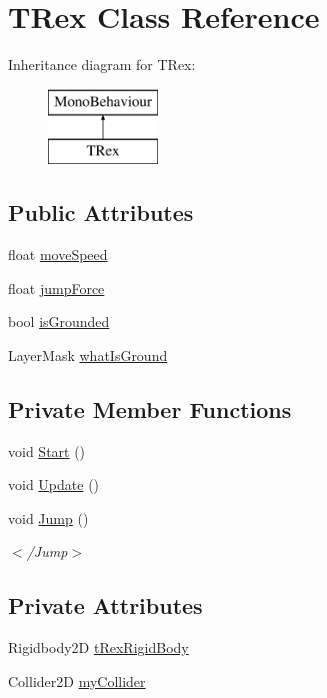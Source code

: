 \hypertarget{class_t_rex}{}\section{T\+Rex Class Reference}
\label{class_t_rex}
Inheritance diagram for T\+Rex\+:\begin{figure}[H]
\begin{center}
\leavevmode
\includegraphics[height=2.000000cm]{class_t_rex}
\end{center}
\end{figure}
\subsection*{Public Attributes}
\begin{DoxyCompactItemize}
\item 
float \hyperlink{class_t_rex_ac2c1c5682d54b9a34e81a87db7232133}{move\+Speed}
\item 
float \hyperlink{class_t_rex_ad3cb47a8543233f79fa0506bf4ab9bf9}{jump\+Force}
\item 
bool \hyperlink{class_t_rex_a59fa915657244a351a19a6772868d10b}{is\+Grounded}
\item 
Layer\+Mask \hyperlink{class_t_rex_a91eb9e9165522f0f231a8e34f56d5919}{what\+Is\+Ground}
\end{DoxyCompactItemize}
\subsection*{Private Member Functions}
\begin{DoxyCompactItemize}
\item 
void \hyperlink{class_t_rex_ab9ca989e4ae071cad6a6766be74ff428}{Start} ()
\item 
void \hyperlink{class_t_rex_ab15426b15c8f9300d335aaeee5a7a7fc}{Update} ()
\item 
void \hyperlink{class_t_rex_a55c1bb4f0e4365269b1022cc9aa4ca8f}{Jump} ()
\begin{DoxyCompactList}\small\item\em $<$/\+Jump$>$ \end{DoxyCompactList}\end{DoxyCompactItemize}
\subsection*{Private Attributes}
\begin{DoxyCompactItemize}
\item 
Rigidbody2D \hyperlink{class_t_rex_afe1565632a661b2b0141b23ff2c26494}{t\+Rex\+Rigid\+Body}
\item 
Collider2D \hyperlink{class_t_rex_a40c401b1a7d0fd1eddd6947f42da7bb8}{my\+Collider}
\end{DoxyCompactItemize}


